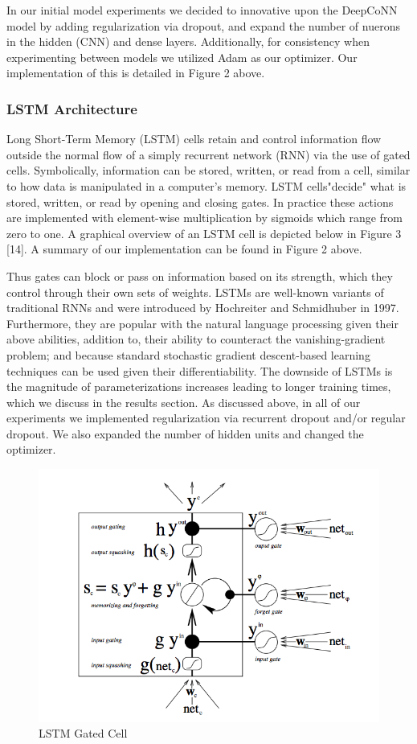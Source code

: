 \documentclass[10pt,twocolumn,letterpaper]{article}
\begin{document}
In our initial model experiments we decided to innovative upon the DeepCoNN model by adding regularization via dropout, and expand the number of nuerons in the hidden (CNN) and dense layers. Additionally, for consistency when experimenting between models we utilized Adam as our optimizer. Our implementation of this is detailed in Figure 2 above.


\subsubsection{LSTM Architecture}
Long Short-Term Memory (LSTM) cells retain and control information flow outside the normal flow of a simply recurrent network (RNN) via the use of gated cells. Symbolically, information can be stored, written, or read from a cell, similar to how data is manipulated in a computer’s memory. LSTM cells"decide" what is stored, written, or read by opening and closing gates. In practice these actions are implemented with element-wise multiplication by sigmoids which range from zero to one. A graphical overview of an LSTM cell is depicted below in Figure 3 [14]. A summary of our implementation can be found in Figure 2 above.

Thus gates can block or pass on information based on its strength, which they control through their own sets of weights. LSTMs are well-known variants of traditional RNNs and were introduced by Hochreiter and Schmidhuber in 1997. Furthermore, they are popular with the natural language processing given their above abilities, addition to, their ability to counteract the vanishing-gradient problem; and because standard stochastic gradient descent-based learning techniques can be used given their differentiability. The downside of LSTMs is the magnitude of parameterizations increases leading to longer training times, which we discuss in the results section. As discussed above, in all of our experiments we implemented regularization via recurrent dropout and/or regular dropout. We also expanded the number of hidden units and changed the optimizer.  

\begin{figure}[!ht]
\includegraphics[scale=0.38]{LSTM.png}
\caption{LSTM Gated Cell}
\end{figure}
\end{document}
